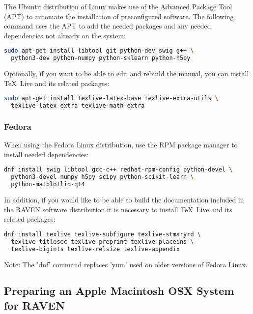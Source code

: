 The Ubuntu distribution of Linux makes use of the Advanced Package Tool
(APT) to automate the installation of preconfigured software.  The following
command uses the APT to add the needed packages and any needed
dependencies not already on the system:

\begin{lstlisting}[language=bash]
sudo apt-get install libtool git python-dev swig g++ \
  python3-dev python-numpy python-sklearn python-h5py
\end{lstlisting}

Optionally, if you want to be able to edit and rebuild the manual, you can
install \TeX~Live and its related packages:
\begin{lstlisting}[language=bash]
sudo apt-get install texlive-latex-base texlive-extra-utils \
  texlive-latex-extra texlive-math-extra
\end{lstlisting}

\goToRavenInstallation

\subsubsection{Fedora}

When using the Fedora Linux distribution, use the RPM package manager to
install needed dependencies:

\begin{lstlisting}[language=bash]
dnf install swig libtool gcc-c++ redhat-rpm-config python-devel \
  python3-devel numpy h5py scipy python-scikit-learn \
  python-matplotlib-qt4
\end{lstlisting}

In addition, if you would like to be able to build the documentation
included in the RAVEN software distribution it is necessary to install
\TeX~Live and its related packages:
\begin{lstlisting}[language=bash]
dnf install texlive texlive-subfigure texlive-stmaryrd \
  texlive-titlesec texlive-preprint texlive-placeins \
  texlive-bigints texlive-relsize texlive-appendix
\end{lstlisting}

Note: The 'dnf' command replaces 'yum' used on older versions of
Fedora Linux.

\goToRavenInstallation

\subsection{Preparing an Apple Macintosh OSX System for RAVEN}
\label{sysprep_osx}

